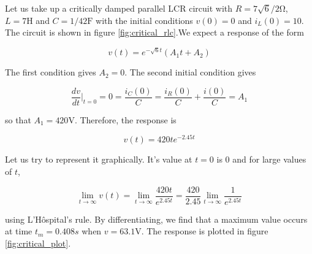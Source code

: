 \documentclass[11pt]{article}
\numberwithin{equation}{section}
\begin{document}
\begin{flushleft}
Let us take up a critically damped parallel LCR circuit with $R = 7\sqrt{6}/2\si{\ohm}$, $L = 7\si{\henry}$ and $C = 1/42\si{\farad}$
with the initial conditions  $v(0) = 0$ and $i_L(0)=10$. The circuit is shown in figure \ref{fig:critical_rlc}.We expect a response of the form

\begin{equation*}
v(t) = e^{-\sqrt{6}t}(A_1t + A_2)
\end{equation*}

The first condition gives $A_2 = 0$. The second initial condition gives

\begin{equation*}
 \frac{dv}{dt}\Biggr|_{t=0} = 0 = \frac{i_C(0)}{C} = \frac{i_R(0)}{C} + \frac{i(0)}{C} = A_1 
\end{equation*}

so that $A_1 = 420 \si{\volt}$. Therefore, the response is

\begin{equation*}
v(t) = 420te^{-2.45t}
\end{equation*}

Let us try to represent it graphically. It's value at $t=0$ is $0$ and for large values of $t$, 

\begin{equation*}
\lim_{t \to \infty}v(t) = \lim_{t \to \infty}\frac{420t}{e^{2.45t}} = \frac{420}{2.45}\lim_{t \to \infty}\frac{1}{e^{2.45t}}
\end{equation*}

using L'H\^{o}spital's rule. By differentiating, we find that a maximum value occurs at time $t_m = 0.408s$ when $v = 63.1\si{\volt}$.
The response is plotted in figure \ref{fig:critical_plot}.

 \begin{figure}[H]
	\centering
\end{figure}
\end{flushleft}
\end{document}
